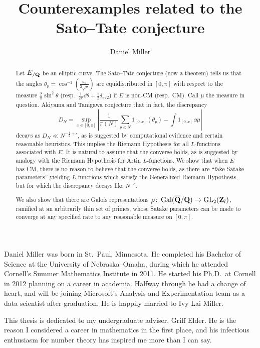 \documentclass[phd,cornellheadings,tocprelim]{cornell}
\title{Counterexamples related to the Sato--Tate conjecture}
\author{Daniel Miller}
\begin{document}
\maketitle
\makecopyright

\begin{abstract}
Let $E_{/\mathbf{Q}}$ be an elliptic curve. The Sato--Tate conjecture (now a theorem) 
tells us that the angles $\theta_p =\cos^{-1}\left(\frac{a_p}{2\sqrt p}\right)$ 
are equidistributed in $[0,\pi]$ with respect to the measure 
$\frac{2}{\pi}\sin^2\theta$ 
(resp.~$\frac{1}{2\pi} \dd \theta + \frac 1 2 \delta_{\pi/2}$) if $E$ is non-CM 
(resp.~CM). Call $\mu$ the measure in question. Akiyama and Tanigawa conjecture 
that in fact, the discrepancy 
\[
	D_N = \sup_{x\in [0,\pi]} \left| \frac{1}{\pi(N)} \sum_{p\leqslant N} 1_{[0,x]}(\theta_p) - \int 1_{[0,x]} \, \dd\mu\right| 
\]
decays as $D_N \ll N^{-\frac 1 2+\epsilon}$, as is suggested by computational 
evidence and certain reasonable heuristics. This implies the Riemann Hypothesis 
for all $L$-functions associated with $E$. It is natural to assume that the 
converse holds, as is suggested by analogy with the Riemann Hypothesis for 
Artin $L$-functions. We show that when $E$ has CM, there is no 
reason to believe that the converse holds, as there are ``fake Satake 
parameters'' yielding $L$-functions which satisfy the Generalized Riemann 
Hypothesis, but for which the discrepancy decays like $N^{-\epsilon}$. 

We also show that there are Galois representations 
$\rho\colon \operatorname{Gal}(\overline {\mathbf{Q}} /\mathbf{Q}) \to \operatorname{GL}_2(\mathbf{Z}_l)$, ramified at an 
arbitrarily thin set of primes, whose Satake parameters can be made to 
converge at any specified rate to any reasonable measure on $[0,\pi]$. 
\end{abstract}

\begin{biosketch}
Daniel Miller was born in St.~Paul, Minnesota. He completed his Bachelor of 
Science at the University of Nebraska--Omaha, during which he attended 
Cornell's Summer Mathematics Institute in 2011. He started his Ph.D.~at 
Cornell in 2012 planning on a career in academia. Halfway through he had a 
change of heart, and will be joining Microsoft's Analysis and Experimentation 
team as a data scientist after graduation. He is happily married to Ivy 
Lai Miller. 
\end{biosketch}

\begin{dedication}
This thesis is dedicated to my undergraduate adviser, Griff Elder. He is the 
reason I considered a career in mathematics in the first place, and his 
infectious enthusiasm for number theory has inspired me more than I can say. 
\end{dedication}
\end{document}
